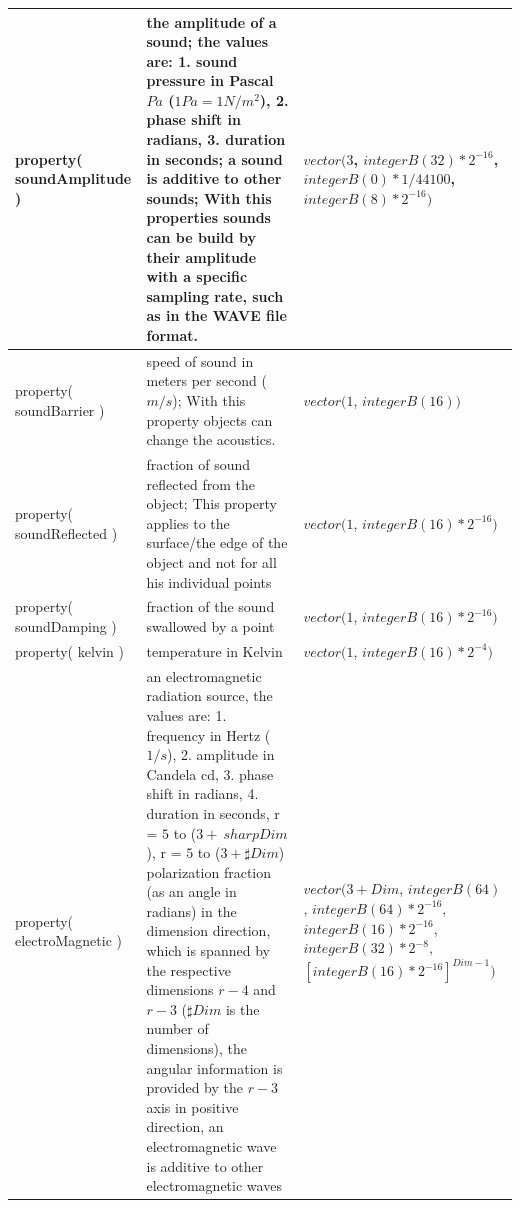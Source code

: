 \begin{center}
\begin{longtable}{|p{20mm}|p{55mm}|p{50mm}|}
	property( soundAmplitude ) & the amplitude of a sound; the values are: 1. sound pressure in Pascal $Pa$ ($1 Pa= 1 N/m^2$), 2. phase shift in radians, 3. duration in seconds; a sound is additive to other sounds; With this properties sounds can be build by their amplitude with a specific sampling rate, such as in the WAVE file format. & $vector( 3$, $integerB(32)*2^{-16}$,  $integerB(0) * 1/44100$, $integerB(8) * 2^{-16}  )$ \\\hline

	property( soundBarrier ) & speed of sound in meters per second ($m/s$); With this property objects can change the acoustics. & $vector( 1$, $integerB(16) )$ \\\hline
	property( soundReflected ) & fraction of sound reflected from the object; This property applies to the surface/the edge of the object and not for all his individual points & $vector( 1$, $integerB(16) * 2^{-16} )$ \\\hline
	property( soundDamping ) & fraction of the sound swallowed by a point & $vector( 1$, $integerB(16) * 2^{-16} )$  \\\hline

	property( kelvin ) & temperature in Kelvin & $vector( 1$, $integerB(16) * 2^{-4} )$ \\\hline
	property( electroMagnetic ) & an electromagnetic radiation source, the values are: 1. frequency in Hertz ($1/s$), 2. amplitude in Candela cd, 3. phase shift in radians, 4. duration in seconds, r = $5$ to ($3 + \ sharp Dim$), r = $5$ to ($3 + \sharp Dim$) polarization fraction (as an angle in radians) in the dimension direction, which is spanned by the respective dimensions $r-4$ and $r-3$ ($\sharp Dim$ is the number of dimensions), the angular information is provided by the $r-3$ axis in positive direction, an electromagnetic wave is additive to other electromagnetic waves & $vector( 3 + Dim$, $integerB(64)$, $integerB(64) * 2^{-16}$, $integerB(16) * 2^{-16}$, $integerB(32) * 2^{-8},$ $[integerB(16) * 2^{-16}]^{Dim-1}  )$ \\\hline


\end{longtable}
\end{center}

